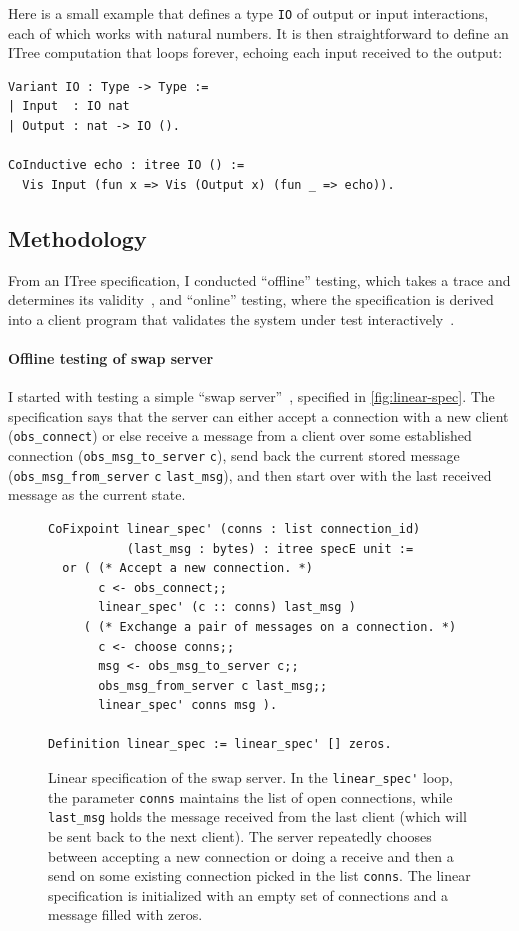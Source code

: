 \documentclass{article}
\newcommand{\ilc}[1]{\lstinline[style=customcoq]{#1}}
\theoremstyle{definition}
\begin{document}
Here is a small example that defines a type \ilc{IO} of output or input
interactions, each of which works with natural numbers.  It is then
straightforward to define an ITree computation that loops forever, echoing each
input received to the output:

\begin{lstlisting}[style=customcoq]
Variant IO : Type -> Type :=
| Input  : IO nat
| Output : nat -> IO ().

CoInductive echo : itree IO () :=
  Vis Input (fun x => Vis (Output x) (fun _ => echo)).
\end{lstlisting}

\subsection{Methodology}
From an ITree specification, I conducted ``offline'' testing, which takes a
trace and determines its validity~\cite{cpp19}, and ``online'' testing, where
the specification is derived into a client program that validates the system
under test interactively~\cite{issta21}.

\paragraph{Offline testing of swap server}
I started with testing a simple ``swap server''~\cite{cpp19}, specified in
\autoref{fig:linear-spec}.  The specification says that the server can either
accept a connection with a new client (\ilc{obs_connect}) or else receive a
message from a client over some established connection (\ilc{obs_msg_to_server}
\ilc{c}), send back the current stored message (\ilc{obs_msg_from_server}
\ilc{c} \ilc{last_msg}), and then start over with the last received message as
the current state.

\begin{figure}
\begin{lstlisting}[style=customcoq]
CoFixpoint linear_spec' (conns : list connection_id)
           (last_msg : bytes) : itree specE unit :=
  or ( (* Accept a new connection. *)
       c <- obs_connect;;
       linear_spec' (c :: conns) last_msg )
     ( (* Exchange a pair of messages on a connection. *)
       c <- choose conns;;
       msg <- obs_msg_to_server c;;
       obs_msg_from_server c last_msg;;
       linear_spec' conns msg ).

Definition linear_spec := linear_spec' [] zeros.
\end{lstlisting}
\caption{Linear specification of the swap server.  In the \ilc{linear_spec'}
  loop, the parameter \ilc{conns} maintains the list of open connections, while
  \ilc{last_msg} holds the message received from the last client (which will be
  sent back to the next client).  The server repeatedly chooses between
  accepting a new connection or doing a receive and then a send on some existing
  connection picked in the list \ilc{conns}.  The linear specification is
  initialized with an empty set of connections and a message filled with zeros.}
\label{fig:linear-spec}
\end{figure}
\end{document}
